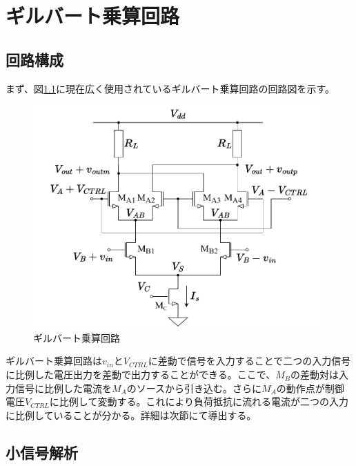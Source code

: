 \chapter{ギルバート乗算回路}
    \section{回路構成}
        まず、図\ref{fig:2_gilbert}に現在広く使用されているギルバート乗算回路の回路図を示す。
        \begin{figure}[!b]
            \begin{center}
                \includegraphics[width=0.99\textwidth]{figures/chapter2/gilbert.pdf}
                \caption{ギルバート乗算回路}
                \label{fig:2_gilbert}
            \end{center}
        \end{figure}
        ギルバート乗算回路は$v_{in}$と$V_{CTRL}$に差動で信号を入力することで二つの入力信号に比例した電圧出力を差動で出力することができる。ここで、$M_{B}$の差動対は入力信号に比例した電流を$M_{A}$のソースから引き込む。さらに$M_{A}$の動作点が制御電圧$V_{CTRL}$に比例して変動する。これにより負荷抵抗に流れる電流が二つの入力に比例していることが分かる。詳細は次節にて導出する。


    \section{小信号解析}
